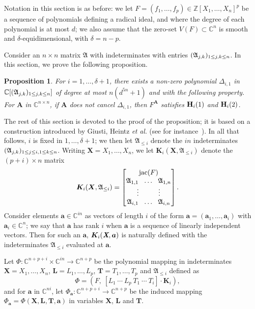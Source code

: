 \documentclass[12pt]{article}
\def\A{\mathfrak{A}}
\def\Xb{\textit{\textbf{X}}}
\def\mA{{\bm A}}
\def\D{\Delta}
\DeclareMathOperator{\jac}{jac}
\newcommand{\ZZ}{{\mathbb{Z}}}
\def\C{\mathbb{C}}
\def\bbm{\begin{bmatrix}}
\def\ebm{\end{bmatrix}}
\newtheorem{prop}[theorem]{Proposition}
\begin{document}
Notation in this section is as before: we let $F=(f_1,\hdots,f_p) \in
\ZZ[X_1,\hdots,X_n]^p$ be a sequence of polynomials defining a radical
ideal, and where the degree of each polynomial is at most $d$; we 
also assume that the zero-set $V(F) \subset \C^n$ is smooth 
and $\delta$-equidimensional, with $\delta=n-p$. 

Consider an $n \times n$ matrix $\A$ with indeterminates with entries
$(\frak A_{j,k})_{1\le j,k \le n}$. In this section, we prove the
following proposition.

\begin{prop}\label{prop:Hi12}
  For $i=1,\dots,\delta+1$, there exists a non-zero polynomial
  $\D_{i,1}$ in $\C[(\frak A_{j,k})_{1\le j,k \le n}]$ of degree
  at most $n(d^{5n}+1)$ and with the following property. For $\mA$ in
  $\C^{n\times n}$, if $\mA$ does not cancel $\D_{i,1}$, then $F^\mA$
  satisfies ${\bf H}_i(1)$ and ${\bf H}_i(2)$.
\end{prop}
The rest of this section is devoted to the proof of the proposition;
it is based on a construction introduced by Giusti, Heintz {\it et
  al.} (see for instance~\cite{BaGiHeSaSh10}). In all that follows,
$i$ is fixed in $1,\dots,\delta+1$; we then let $\A_{\le i}$ denote
the $in$ indeterminates $(\frak A_{j,k})_{1\le j \le i, 1 \le k \le
  n}$. Writing $\bm X=X_1,\dots,X_n$, we let $\bm K_i(\bm X,\A_{\le
  i})$ denote the $(p+i)\times n$ matrix
\[
\bm
K_i(\bm X, \A_{\le i})=
\bbm 
\jac(F)\\
\A_{1,1}~~ \hdots ~~\A_{1,n}\\
\vdots\hspace{10mm}\vdots\\
\A_{i,1}~~ \hdots ~~\A_{i,n}
\ebm.
\]
Consider elements $\bm a \in \C^{in}$ as vectors of length $i$ of the
form $\bm a = (\bm a_1,\hdots,\bm a_i)$ with $\bm a_i \in \C^n$;
we say that $\bm a$ has rank $i$
when $\bm a$ is a sequence of linearly independent vectors.  Then
for such an $\bm a$, $\bm K_i(\Xb,\bm a)$ is naturally defined with the
indeterminates $\A_{\le i}$ evaluated at $\bm a$. 

Let $\Phi: \C^{n+p+i}\times \C^{i n} \to \C^{n+p}$ be  the polynomial mapping
in indeterminates 
$\bm X=X_1,\dots,X_n$, $\bm L=L_1,\dots,L_p$, $\bm T=T_1,\dots,T_p$ 
and $\A_{\le i}$ 
defined as
\[\Phi = ( F,\ [L_1 ~\cdots~L_p~T_1~\cdots~T_i] \cdot \bm K_i ),\]
and for $\bm a$ in $\C^{ni}$, let $\Phi_{\bm a}: \C^{n+p+i} \to
\C^{n+p}$ be the induced mapping $\Phi_{\bm a} = \Phi(\bm X, \bm L, \bm
T, \bm a)$ in variables $\bm X$, $\bm L$ and $\bm T$.
\end{document}
